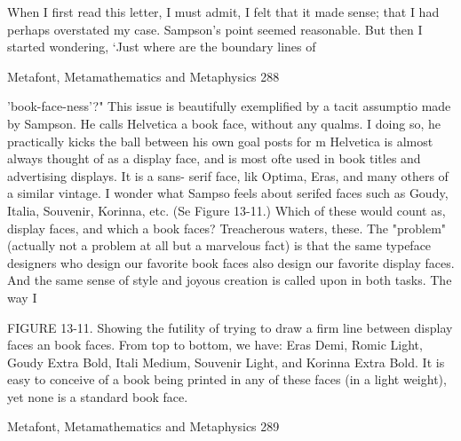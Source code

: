        When I first read this letter, I must admit, I felt that it made sense; that I had
perhaps overstated my case. Sampson's point seemed reasonable. But then I started
wondering, `Just where are the boundary lines of




Metafont, Metamathematics and Metaphysics                                              288

'book-face-ness'?" This issue is beautifully exemplified by a tacit assumptio made by
Sampson. He calls Helvetica a book face, without any qualms. I doing so, he practically
kicks the ball between his own goal posts for m Helvetica is almost always thought of as
a display face, and is most ofte used in book titles and advertising displays. It is a sans-
serif face, lik Optima, Eras, and many others of a similar vintage. I wonder what Sampso
feels about serifed faces such as Goudy, Italia, Souvenir, Korinna, etc. (Se Figure 13-11.)
Which of these would count as, display faces, and which a book faces?
        Treacherous waters, these. The "problem" (actually not a problem at all but a
marvelous fact) is that the same typeface designers who design our favorite book faces
also design our favorite display faces. And the same sense of style and joyous creation is
called upon in both tasks. The way I

        FIGURE 13-11. Showing the futility of trying to draw a firm line between display
faces an book faces. From top to bottom, we have: Eras Demi, Romic Light, Goudy Extra
Bold, Itali Medium, Souvenir Light, and Korinna Extra Bold. It is easy to conceive of a
book being printed in any of these faces (in a light weight), yet none is a standard book
face.




Metafont, Metamathematics and Metaphysics                                               289

